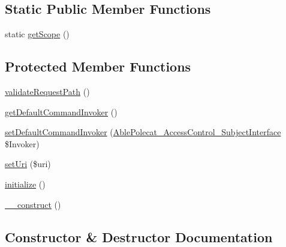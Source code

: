 \subsection*{Static Public Member Functions}
\begin{DoxyCompactItemize}
\item 
static \hyperlink{class_able_polecat___resource_abstract_ad9ade868bd136d32967059d1cccb3e92}{get\+Scope} ()
\end{DoxyCompactItemize}
\subsection*{Protected Member Functions}
\begin{DoxyCompactItemize}
\item 
\hyperlink{class_able_polecat___resource_abstract_a285e624ef8874265991ea3478a7cd301}{validate\+Request\+Path} ()
\item 
\hyperlink{class_able_polecat___resource_abstract_a60be366090fa500d8062c7dfc40bfaf6}{get\+Default\+Command\+Invoker} ()
\item 
\hyperlink{class_able_polecat___resource_abstract_a8af7037413ce56303d66df3b83c9f6d3}{set\+Default\+Command\+Invoker} (\hyperlink{interface_able_polecat___access_control___subject_interface}{Able\+Polecat\+\_\+\+Access\+Control\+\_\+\+Subject\+Interface} \$Invoker)
\item 
\hyperlink{class_able_polecat___resource_abstract_ad259dd848ddd1f85513d77f16684564e}{set\+Uri} (\$uri)
\item 
\hyperlink{class_able_polecat___resource_abstract_a91098fa7d1917ce4833f284bbef12627}{initialize} ()
\item 
\hyperlink{class_able_polecat___resource_abstract_a095c5d389db211932136b53f25f39685}{\+\_\+\+\_\+construct} ()
\end{DoxyCompactItemize}


\subsection{Constructor \& Destructor Documentation}
\hypertarget{class_able_polecat___resource_abstract_a095c5d389db211932136b53f25f39685}{}
